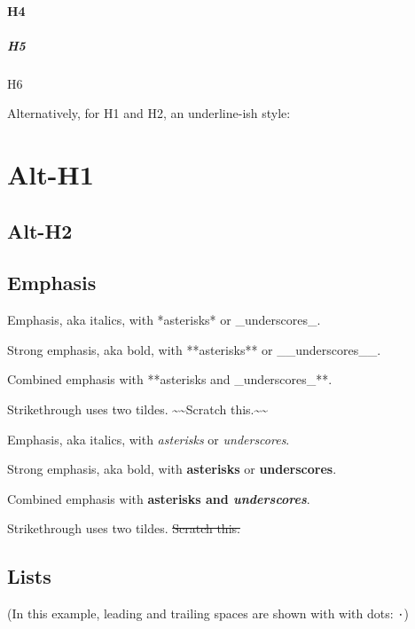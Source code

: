 \documentclass[
]{article}
\newenvironment{Shaded}{}{}
\newcommand{\NormalTok}[1]{#1}
\begin{document}
\paragraph{H4}\label{h4}

\subparagraph{H5}\label{h5}

H6

Alternatively, for H1 and H2, an underline-ish style:

\section{Alt-H1}\label{alt-h1}

\subsection{Alt-H2}\label{alt-h2}

\subsection{Emphasis}\label{emphasis}

\begin{Shaded}
\begin{Highlighting}[]
\NormalTok{Emphasis, aka italics, with *asterisks* or \_underscores\_.}

\NormalTok{Strong emphasis, aka bold, with **asterisks** or \_\_underscores\_\_.}

\NormalTok{Combined emphasis with **asterisks and \_underscores\_**.}

\NormalTok{Strikethrough uses two tildes. \textasciitilde{}\textasciitilde{}Scratch this.\textasciitilde{}\textasciitilde{}}
\end{Highlighting}
\end{Shaded}

Emphasis, aka italics, with \emph{asterisks} or \emph{underscores}.

Strong emphasis, aka bold, with \textbf{asterisks} or
\textbf{underscores}.

Combined emphasis with \textbf{asterisks and \emph{underscores}}.

Strikethrough uses two tildes. \st{Scratch this.}

\subsection{Lists}\label{lists}

(In this example, leading and trailing spaces are shown with with dots:
\texttt{⋅})
\end{document}
